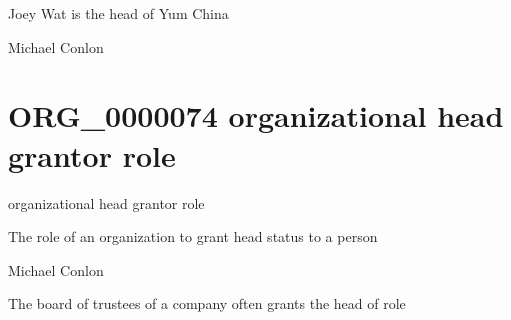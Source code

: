 \documentclass[letterpaper,10pt,english]{sphinxmanual}
\begin{document}
\begin{sphinxShadowBox}

\sphinxAtStartPar
Joey Wat is the head of Yum China
\end{sphinxShadowBox}

\begin{sphinxShadowBox}

\sphinxAtStartPar
Michael Conlon 
\end{sphinxShadowBox}
\begin{quote}
\label{\detokenize{doc-ORG_0000074:org-0000074}}\label{\detokenize{doc-ORG_0000074:organizational-head-grantor-role}}\label{\detokenize{doc-ORG_0000074:org-0000074}}
\ignorespaces \end{quote}


\section{ORG\_0000074 \sphinxhyphen{} organizational head grantor role}
\label{\detokenize{doc-ORG_0000074:org-0000074-organizational-head-grantor-role}}\label{\detokenize{doc-ORG_0000074:index-0}}\label{\detokenize{doc-ORG_0000074::doc}}
\begin{sphinxShadowBox}

\sphinxAtStartPar
organizational head grantor role
\end{sphinxShadowBox}

\begin{sphinxShadowBox}

\sphinxAtStartPar
The role of an organization to grant head status to a person
\end{sphinxShadowBox}

\begin{sphinxShadowBox}

\sphinxAtStartPar
Michael Conlon 
\end{sphinxShadowBox}

\begin{sphinxShadowBox}

\sphinxAtStartPar
The board of trustees of a company often grants the head of role
\end{sphinxShadowBox}
\end{document}
